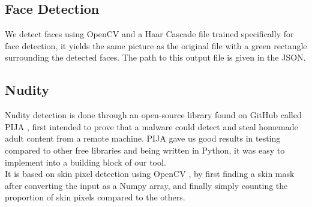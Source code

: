 \documentclass{article}
\begin{document}
    \subsection{Face Detection}
        We detect faces using OpenCV and a Haar Cascade file trained specifically for face detection, it yields the same picture as the original file with a green rectangle surrounding the detected faces. The path to this output file is given in the JSON.
    \subsection{Nudity}
        Nudity detection is done through an open-source library found on GitHub called PIJA \cite{pija}, first intended to prove that a malware could detect and steal homemade adult content from a remote machine. PIJA gave us good results in testing compared to other free libraries and being written in Python, it was easy to implement into a building block of our tool. 
        \\It is based on skin pixel detection using OpenCV \cite{opencv}, by first finding a skin mask after converting the input as a Numpy array, and finally simply counting the proportion of skin pixels compared to the others.
\end{document}
